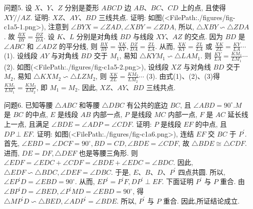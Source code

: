 问题5. 设 $X 、 Y 、 Z$ 分别是菱形 $A B C D$ 边 $A B 、 B C 、 C D$ 上的点, 且使得 $X Y / / A Z$. 证明: $X Z 、 A Y 、 B D$ 三线共点.
证明: 如图(<FilePath:./figures/fig-c1a5-1.png>),  注意到 $\angle B Y X=\angle Z A D, \angle X B Y=\angle Z D A$, 所以, $\triangle X B Y \backsim \triangle Z D A$. 故 $\frac{B X}{B Y}=\frac{D Z}{D A}$.
设 $K 、 L$ 分别是对角线 $B D$ 与线段 $X Y 、 A Z$ 的交点.
因为 $B D$ 是 $\angle A B C$ 和 $\angle A D Z$ 的平分线, 则 $\frac{B X}{B Y}=\frac{X K}{K Y}, \frac{D Z}{D A}=\frac{Z L}{L A}$. 从而, $\frac{X K}{K Y}=\frac{Z L}{L A}$ 或 $\frac{X K}{Z L}= \frac{K Y}{L A} \cdots$ (1). 设线段 $A Y$ 与对角线 $B D$ 交于 $M_1$, 易知 $\triangle K Y M_1 \backsim \triangle L A M_1$. 则 $\frac{K Y}{L A}= \frac{K M_1}{L M_1} \cdots$ (2). 如图(<FilePath:./figures/fig-c1a5-2.png>),  设线段 $X Z$ 与对角线 $B D$ 交于 $M_2$, 易知 $\triangle K X M_2 \backsim \triangle L Z M_2$, 则 $\frac{X K}{Z L}=\frac{K M_2}{L M_2} \cdots$ (3). 由式(1)、(2)、(3)得 $\frac{K M_1}{L M_1}=\frac{K M_2}{L M_2}$, 即 $M_1=M_2$. 因此, $X Z 、 A Y 、 B D$ 三线共点.



问题6. 已知等腰 $\triangle A B C$ 和等腰 $\triangle D B C$ 有公共的底边 $B C$, 且 $\angle A B D=90^{\circ} . M$ 是 $B C$ 的中点, $E$ 是线段 $A B$ 内部一点, $P$ 是线段 $M C$ 内部一点, $F$ 是 $A C$ 延长线上一点, 且满足 $\angle B D E=\angle A D P=\angle C D F$. 证明: $P$ 是线段 $E F$ 的中点, 且 $D P \perp E F$.
证明: 如图(<FilePath:./figures/fig-c1a6.png>), 连结 $E F$ 交 $B C$ 于 $P^{\prime}$. 首先, $\angle E B D= \angle D C F=90^{\circ}, B D=C D, \angle B D E=\angle C D F$, 故 $\triangle B D E \cong \triangle C D F$. 进而, $D E=D F, \triangle D E F$ 也是等腰三角形.
则 $\angle E D F=\angle E D C+\angle C D F=\angle B D E+ \angle E D C=\angle B D C$. 因此, $\triangle E D F \backsim \triangle B D C, \angle D E F= \angle D B C$. 于是, $E 、 B 、 D 、 P^{\prime}$ 四点共圆.
所以, $\angle E P^{\prime} D= \angle E B D=90^{\circ}$. 从而, $E P^{\prime}=P^{\prime} F, D P^{\prime} \perp E F$. 下面证明
$P^{\prime}$ 与 $P$ 重合.
由 $\angle B P^{\prime} D=\angle B E D, \angle P^{\prime} M D=\angle E B D=90^{\circ}$, 得 $\triangle M P^{\prime} D \backsim \triangle B E D, \angle A D P^{\prime}=\angle B D E$. 所以, $P^{\prime}$ 与 $P$ 重合.
因此,所证结论成立.



